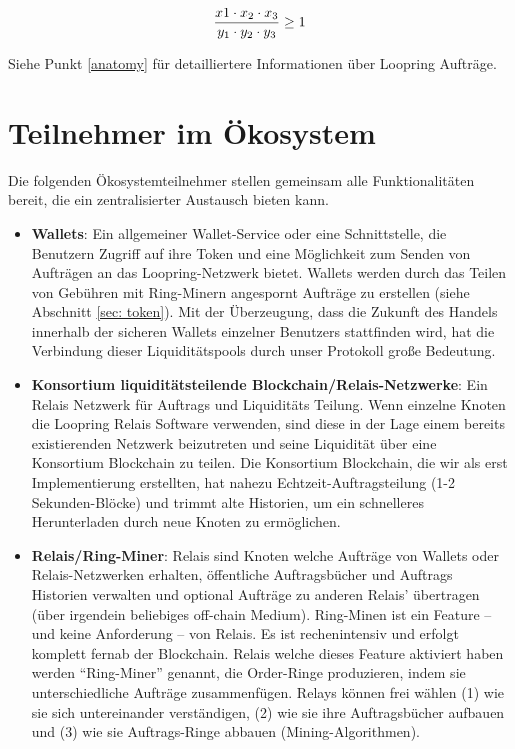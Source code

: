 \documentclass[UTF8,nofonts]{article}
\begin{document}
\begin{multicols}{2}
\begin{equation}
{{x1 \cdot x_2 \cdot x_3 \over y_1 \cdot y_2 \cdot y_3} \geq 1}
\end{equation}


Siehe Punkt \ref{anatomy} für detailliertere Informationen über Loopring Aufträge.



\section{Teilnehmer im Ökosystem\label{sec:ecosystem}}
Die folgenden Ökosystemteilnehmer stellen gemeinsam alle Funktionalitäten bereit, die ein zentralisierter Austausch bieten kann.

\begin{itemize}

\item \textbf{Wallets}: Ein allgemeiner Wallet-Service oder eine Schnittstelle, die Benutzern Zugriff auf ihre Token und eine Möglichkeit zum Senden von Aufträgen an das Loopring-Netzwerk bietet. Wallets werden durch das Teilen von Gebühren mit Ring-Minern angespornt Aufträge zu erstellen (siehe Abschnitt \ref{sec: token}). Mit der Überzeugung, dass die Zukunft des Handels innerhalb der sicheren Wallets einzelner Benutzers stattfinden wird, hat die Verbindung dieser Liquiditätspools durch unser Protokoll große Bedeutung.

\item \textbf{Konsortium liquiditätsteilende Blockchain/Relais-Netzwerke}: Ein Relais Netzwerk für Auftrags und Liquiditäts Teilung. Wenn einzelne Knoten die Loopring Relais Software verwenden, sind diese in der Lage einem bereits existierenden Netzwerk beizutreten und seine Liquidität über eine Konsortium Blockchain zu teilen. Die Konsortium Blockchain, die wir als erst Implementierung erstellten, hat nahezu Echtzeit-Auftragsteilung (1-2 Sekunden-Blöcke) und trimmt alte Historien, um ein schnelleres Herunterladen durch neue Knoten zu ermöglichen.

\item \textbf{Relais/Ring-Miner}: Relais sind Knoten welche Aufträge von Wallets oder Relais-Netzwerken erhalten, öffentliche Auftragsbücher und Auftrags Historien verwalten und optional Aufträge zu anderen Relais' übertragen (über irgendein beliebiges off-chain Medium). Ring-Minen ist ein Feature -- und keine Anforderung -- von Relais. Es ist rechenintensiv und erfolgt komplett fernab der Blockchain. Relais welche dieses Feature aktiviert haben werden \enquote{Ring-Miner} genannt, die Order-Ringe produzieren, indem sie unterschiedliche Aufträge zusammenfügen. Relays können frei wählen (1) wie sie sich untereinander verständigen, (2) wie sie ihre Auftragsbücher aufbauen und (3) wie sie Auftrags-Ringe abbauen (Mining-Algorithmen).


\end{itemize}
\end{multicols}
\end{document}
